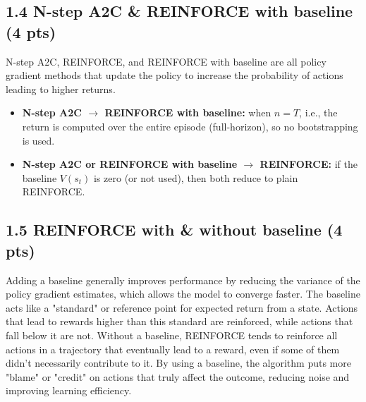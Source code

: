 \documentclass[12pt]{article}
\begin{document}
\subsection*{1.4 N-step A2C \& REINFORCE with baseline (4 pts)}
\begin{solution}[height=5cm]
N-step A2C, REINFORCE, and REINFORCE with baseline are all policy gradient methods that update the policy to increase the probability of actions leading to higher returns. 
\begin{itemize}
    \item \textbf{N-step A2C $\rightarrow$ REINFORCE with baseline:} when $n=T$, i.e., the return is computed over the entire episode (full-horizon), so no bootstrapping is used.
    \item \textbf{N-step A2C or REINFORCE with baseline $\rightarrow$ REINFORCE:} if the baseline $V(s_t)$ is zero (or not used), then both reduce to plain REINFORCE.
\end{itemize}

\end{solution}

\subsection*{1.5 REINFORCE with \& without baseline (4 pts)}
\begin{solution}[height=5cm]
Adding a baseline generally improves performance by reducing the variance of the policy gradient estimates, 
which allows the model to converge faster. 
The baseline acts like a "standard" or reference point for expected return from a state. 
Actions that lead to rewards higher than this standard are reinforced, 
while actions that fall below it are not. 
Without a baseline, REINFORCE tends to reinforce all actions in a trajectory that eventually lead to a reward, 
even if some of them didn't necessarily contribute to it. 
By using a baseline, the algorithm puts more "blame" or "credit" on actions that truly affect the outcome, 
reducing noise and improving learning efficiency.

\end{solution}
\end{document}
